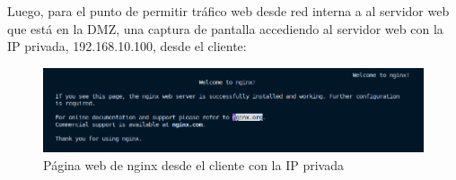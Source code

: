 \documentclass[11pt]{report} %
\begin{document}
\cleardoublepage

Luego, para el punto de permitir tráfico web desde red interna a al servidor web que está en la DMZ, 
una captura de pantalla accediendo al servidor web con la IP privada, 192.168.10.100, desde el cliente:

\begin{figure}[H]
  \centering
  \includegraphics[scale=0.5]{img/nginx_cliente_privada.png}
  \caption{Página web de nginx desde el cliente con la IP privada}
  \label{fig:página web de nginx desde el cliente con la IP privada}
\end{figure}
\end{document}
